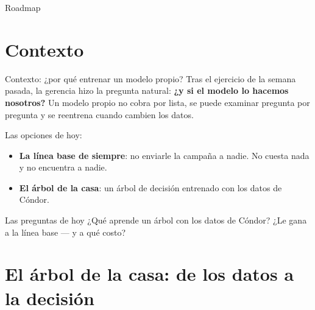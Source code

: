 \documentclass{beamer}
\begin{document}
\begin{frame}[noframenumbering]{Roadmap}
\tableofcontents
\end{frame}

\section{Contexto}

\begin{frame}{Contexto: ¿por qué entrenar un modelo propio?}
\small
Tras el ejercicio de la semana pasada, la gerencia hizo la pregunta natural: \textbf{¿y si el modelo lo hacemos nosotros?} Un modelo propio no cobra por lista, se puede examinar pregunta por pregunta y se reentrena cuando cambien los datos.

\vspace{0.15cm}
Las opciones de hoy:
\begin{itemize} \setlength{\itemsep}{0.08cm}
  \item \textbf{La línea base de siempre}: no enviarle la campaña a nadie. No cuesta nada y no encuentra a nadie.
  \item \textbf{El árbol de la casa}: un árbol de decisión entrenado con los datos de Cóndor.
\end{itemize}

\vspace{0.15cm}
\begin{block}{Las preguntas de hoy}
¿Qué aprende un árbol con los datos de Cóndor? ¿Le gana a la línea base --- y a qué costo?
\end{block}
\end{frame}

\section{El árbol de la casa: de los datos a la decisión}
\end{document}
